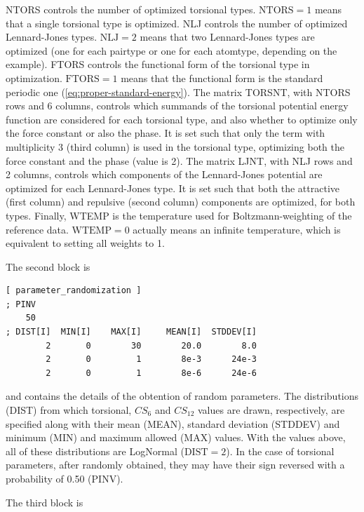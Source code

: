 \documentclass[10pt,a4paper,openany]{memoir}
\numberwithin{equation}{section}
\newcommand{\varset}[2]{$\text{#1}=#2$}
\begin{document}
\noindent
NTORS controls the number of optimized torsional types.  \varset{NTORS}{1} means
that a single torsional type is optimized.  NLJ controls the number of optimized
Lennard-Jones types.  \varset{NLJ}{2} means that two Lennard-Jones types are
optimized (one for each pairtype or one for each atomtype, depending on the
example).  FTORS controls the functional form of the torsional type in
optimization.  \varset{FTORS}{1} means that the functional form is the standard
periodic one (\autoref{eq:proper-standard-energy}).  The matrix TORSNT, with
NTORS rows and 6 columns, controls which summands of the torsional potential
energy function are considered for each torsional type, and also whether to
optimize only the force constant or also the phase.  It is set such that only
the term with multiplicity 3 (third column) is used in the torsional type,
optimizing both the force constant and the phase (value is 2).  The matrix LJNT,
with NLJ rows and 2 columns, controls which components of the Lennard-Jones
potential are optimized for each Lennard-Jones type. It is set such that both
the attractive (first column) and repulsive (second column) components are
optimized, for both types. Finally, WTEMP is the temperature used for
Boltzmann-weighting of the reference data.  \varset{WTEMP}{0} actually means an
infinite temperature, which is equivalent to setting all weights to 1.

The second block is

\begin{lstlisting}[language=gromacs]
[ parameter_randomization ]
; PINV
    50
; DIST[I]  MIN[I]    MAX[I]     MEAN[I]  STDDEV[I]
        2       0        30        20.0        8.0
        2       0         1        8e-3      24e-3
        2       0         1        8e-6      24e-6
\end{lstlisting}\vspace{2ex}\par

\noindent and contains the details of the obtention of random
parameters.
%
The distributions (DIST) from which torsional, $CS_6$ and $CS_{12}$
values are drawn, respectively, are specified along with their mean
(MEAN), standard deviation (STDDEV) and minimum (MIN) and maximum
allowed (MAX) values.
%
With the values above, all of these distributions are LogNormal
(\varset{DIST}{2}).
%
In the case of torsional parameters, after randomly obtained, they may
have their sign reversed with a probability of 0.50 (PINV).

The third block is
\end{document}
